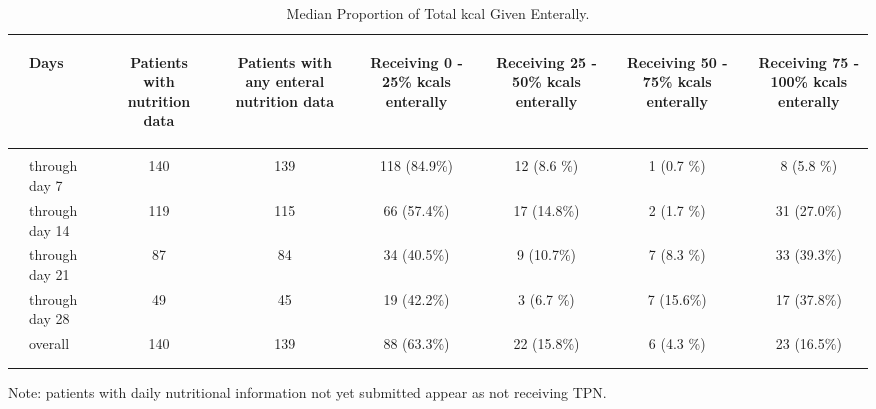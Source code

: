 \documentclass[dvips, 10pt]{article}
\begin{document}
\begin{table}[t]
\caption
{ Median Proportion of Total kcal Given Enterally. }
\begin{center}
\begin{tabular}{ @{}l@{}
@{}l@{}@{}p{1.5em}@{}@{}c@{}@{}p{1.5em}@{}@{}c@{}@{}p{1.5em}@{}@{}c@{}@{}p{1.5em}@{}@{}c@{}@{}p{1.5em}@{}@{}c@{}@{}p{1.5em}@{}@{}c@{}
}
\hline

& \parbox{6em}{\begin{center}Days\end{center}} && \parbox{6em}{\begin{center}Patients with nutrition data\end{center}} && \parbox{6em}{\begin{center}Patients with any enteral nutrition data\end{center}} && \parbox{6em}{\begin{center}Receiving 0 - 25\% kcals enterally\end{center}} && \parbox{6em}{\begin{center}Receiving 25 - 50\% kcals enterally\end{center}} && \parbox{6em}{\begin{center}Receiving 50 - 75\% kcals enterally\end{center}} && \parbox{6em}{\begin{center}Receiving 75 - 100\% kcals enterally\end{center}} \\

\hline

\\
& through day 7 && 140 && 139 && 118 (84.9\%) && 12 (8.6 \%) && 1 (0.7 \%) && 8 (5.8 \%) \\
& through day 14 && 119 && 115 && 66 (57.4\%) && 17 (14.8\%) && 2 (1.7 \%) && 31 (27.0\%) \\
& through day 21 && 87 && 84 && 34 (40.5\%) && 9 (10.7\%) && 7 (8.3 \%) && 33 (39.3\%) \\
& through day 28 && 49 && 45 && 19 (42.2\%) && 3 (6.7 \%) && 7 (15.6\%) && 17 (37.8\%) \\
& overall && 140 && 139 && 88 (63.3\%) && 22 (15.8\%) && 6 (4.3 \%) && 23 (16.5\%) \\
\\
\hline \\

\end{tabular}


\parbox{ 5in }{  Note: patients with daily nutritional information not yet submitted appear as not receiving TPN. } \\
 \vspace{1em}\end{center}
 \end{table}
\end{document}
